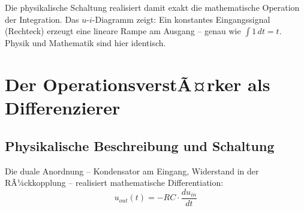﻿\documentclass[12pt, a4paper]{article}
\begin{document}
	Die physikalische Schaltung realisiert damit exakt die mathematische Operation der Integration. Das $u$-$i$-Diagramm zeigt: Ein konstantes Eingangssignal (Rechteck) erzeugt eine lineare Rampe am Ausgang -- genau wie $\int 1\,dt = t$. Physik und Mathematik sind hier identisch.
	
	\section{Der OperationsverstÃ¤rker als Differenzierer}
	
	\subsection{Physikalische Beschreibung und Schaltung}
	
	Die duale Anordnung -- Kondensator am Eingang, Widerstand in der RÃ¼ckkopplung -- realisiert mathematische Differentiation:
	\begin{equation}
		u_{out}(t) = -RC \cdot \frac{du_{in}}{dt}
	\end{equation}
	
\end{document}
